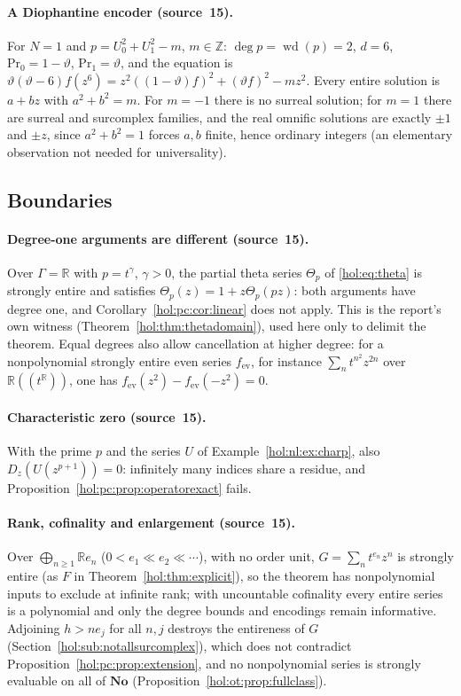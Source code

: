\documentclass[11pt]{article}
\numberwithin{equation}{section}
\theoremstyle{definition}
\theoremstyle{remark}
\newcommand{\R}{\mathbb R}
\newcommand{\Z}{\mathbb Z}
\newcommand{\No}{\mathbf{No}}
\begin{document}
\paragraph{A Diophantine encoder (source~15).}
For $N=1$ and $p=U_0^2+U_1^2-m$, $m\in\Z$: $\deg p=\operatorname{wd}(p)=2$,
$d=6$, $\mathrm{Pr}_0=1-\vartheta$, $\mathrm{Pr}_1=\vartheta$, and the equation is
$\vartheta(\vartheta-6)f(z^6)=z^2((1-\vartheta)f)^2+(\vartheta f)^2-mz^2$. Every
entire solution is $a+bz$ with $a^2+b^2=m$. For $m=-1$ there is no surreal
solution; for $m=1$ there are surreal and surcomplex families, and the real
omnific solutions are exactly $\pm1$ and $\pm z$, since $a^2+b^2=1$ forces $a,b$
finite, hence ordinary integers (an elementary observation not needed for
universality).

\subsection{Boundaries}\label{hol:pc:sub:boundaries}

\paragraph{Degree-one arguments are different (source~15).}
Over $\Gamma=\R$ with $p=t^\gamma$, $\gamma>0$, the partial theta series
$\Theta_p$ of \eqref{hol:eq:theta} is strongly entire and satisfies
$\Theta_p(z)=1+z\Theta_p(pz)$: both arguments have degree one, and
Corollary~\ref{hol:pc:cor:linear} does not apply. This is the report's own
witness (Theorem~\ref{hol:thm:thetadomain}), used here only to delimit the
theorem. Equal degrees also allow cancellation at higher degree: for a
nonpolynomial strongly entire even series $f_{\mathrm{ev}}$, for instance
$\sum_nt^{n^2}z^{2n}$ over $\R((t^\R))$, one has
$f_{\mathrm{ev}}(z^2)-f_{\mathrm{ev}}(-z^2)=0$.

\paragraph{Characteristic zero (source~15).}
With the prime $p$ and the series $U$ of Example~\ref{hol:nl:ex:charp},
also $D_z(U(z^{p+1}))=0$: infinitely
many indices share a residue, and Proposition~\ref{hol:pc:prop:operatorexact}
fails.

\paragraph{Rank, cofinality and enlargement (source~15).}
Over $\bigoplus_{n\ge1}\R e_n$ ($0<e_1\ll e_2\ll\cdots$), with no order unit,
$G=\sum_nt^{e_n}z^n$ is strongly entire (as $F$ in
Theorem~\ref{hol:thm:explicit}), so the theorem has
nonpolynomial inputs to exclude at infinite rank; with uncountable
cofinality every entire series is a polynomial and only the degree bounds and
encodings remain informative. Adjoining $h>ne_j$ for all $n,j$ destroys the
entireness of $G$ (Section~\ref{hol:sub:notallsurcomplex}), which does not
contradict Proposition~\ref{hol:pc:prop:extension}, and no nonpolynomial series
is strongly evaluable on all of $\No$ (Proposition~\ref{hol:ot:prop:fullclass}).
\end{document}
